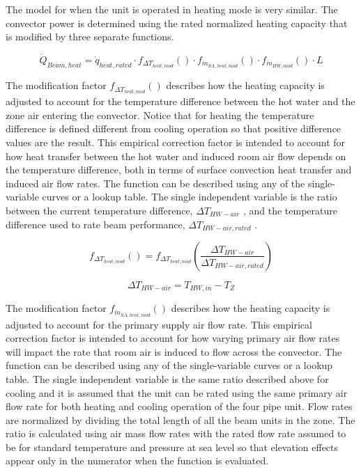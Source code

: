 The model for when the unit is operated in heating mode is very similar. The convector power is determined using the rated normalized heating capacity that is modified by three separate functions.

\begin{equation}
{\dot Q_{Beam, heat}} = {\dot q_{heat,rated}}\cdot f_{ \Delta T_{heat,mod} }() \cdot f_{\dot m_{SA,heat,mod}}()\cdot f_{\dot m_{HW,mod}}() \cdot L
\end{equation}

The modification factor \(f_{ \Delta T_{heat,mod} }()\) describes how the heating capacity is adjusted to account for the temperature difference between the hot water and the zone air entering the convector. Notice that for heating the temperature difference is defined different from cooling operation so that positive difference values are the result. This empirical correction factor is intended to account for how heat transfer between the hot water and induced room air flow depends on the temperature difference, both in terms of surface convection heat transfer and induced air flow rates. The function can be described using any of the single-variable curves or a lookup table. The single independent variable is the ratio between the current temperature difference, \(\Delta T_{HW-air}\) , and the temperature difference used to rate beam performance, \(\Delta T_{HW-air,rated}\) .

\begin{equation}
{f_{ \Delta T_{heat,mod} }()} = f_{ \Delta T_{heat,mod} }\left(\frac{\Delta T_{HW-air}}{\Delta T_{HW-air,rated}}\right)
\end{equation}

\begin{equation}
{\Delta T_{HW-air}} = {T_{HW,in}} -{T_{Z}}
\end{equation}

The modification factor \(f_{\dot m_{SA,heat,mod}}()\) describes how the heating capacity is adjusted to account for the primary supply air flow rate. This empirical correction factor is intended to account for how varying primary air flow rates will impact the rate that room air is induced to flow across the convector. The function can be described using any of the single-variable curves or a lookup table. The single independent variable is the same ratio described above for cooling and it is assumed that the unit can be rated using the same primary air flow rate for both heating and cooling operation of the four pipe unit. Flow rates are normalized by dividing the total length of all the beam units in the zone. The ratio is calculated using air mass flow rates with the rated flow rate assumed to be for standard temperature and pressure at sea level so that elevation effects appear only in the numerator when the function is evaluated.

